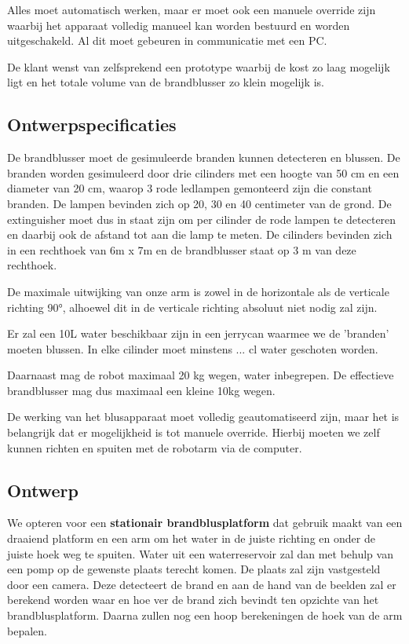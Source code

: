 \documentclass[kulak]{kulakarticle} %
\begin{document}
		Alles moet automatisch werken, maar er moet ook een manuele override zijn waarbij het apparaat volledig manueel kan worden bestuurd en worden uitgeschakeld. Al dit moet gebeuren in communicatie met een PC. 
		
		De klant wenst van zelfsprekend een prototype waarbij de kost zo laag mogelijk ligt en het totale volume van de brandblusser zo klein mogelijk is.



\subsection{Ontwerpspecificaties}
	De brandblusser moet de gesimuleerde branden kunnen detecteren en blussen. De branden worden gesimuleerd door drie cilinders met een hoogte van 50 cm en een diameter van 20 cm, waarop 3 rode ledlampen gemonteerd zijn die constant branden. De lampen bevinden zich op 20, 30 en 40 centimeter van de grond. De extinguisher moet dus in staat zijn om per cilinder de rode lampen te detecteren en daarbij ook de afstand tot aan die lamp te meten. De cilinders bevinden zich in een rechthoek van 6m x 7m en de brandblusser staat op 3 m van deze rechthoek.
	
	De maximale uitwijking van onze arm is zowel in de horizontale als de verticale richting 90°, alhoewel dit in de verticale richting absoluut niet nodig zal zijn.
	
	Er zal een 10L water beschikbaar zijn in een jerrycan waarmee we de 'branden' moeten blussen. In elke cilinder moet minstens ... cl water geschoten worden.
	
	Daarnaast mag de robot maximaal 20 kg wegen, water inbegrepen. De effectieve brandblusser mag dus maximaal een kleine 10kg wegen.
	
	De werking van het blusapparaat moet volledig geautomatiseerd zijn, maar het is belangrijk dat er mogelijkheid is tot manuele override. Hierbij moeten we zelf kunnen richten en spuiten met de robotarm via de computer.
	

\subsection{Ontwerp}
	We opteren voor een \textbf{stationair brandblusplatform} dat gebruik maakt van een draaiend platform en een arm om het water in de juiste richting en onder de juiste hoek weg te spuiten. Water uit een waterreservoir zal dan met behulp van een pomp op de gewenste plaats terecht komen. De plaats zal zijn vastgesteld door een camera. Deze detecteert de brand en aan de hand van de beelden zal er berekend worden waar en hoe ver de brand zich bevindt ten opzichte van het brandblusplatform. Daarna zullen nog een hoop berekeningen de hoek van de arm bepalen. \\
	
\end{document}
